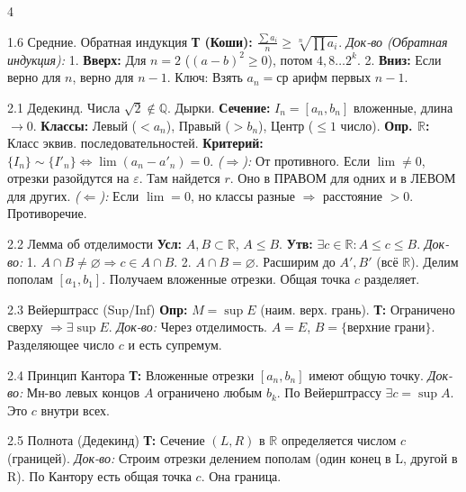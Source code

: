 \documentclass[8pt, a4paper, landscape]{extarticle}
\newcommand{\Ra}{\Rightarrow}
\newcommand{\Q}{\mathbb{Q}}
\newcommand{\R}{\mathbb{R}}
\newcommand{\eps}{\varepsilon}
\begin{document}
\begin{multicols*}{4}
\begin{ticket}{1.6 Средние. Обратная индукция}
\textbf{Т (Коши):} $\frac{\sum a_i}{n} \ge \sqrt[n]{\prod a_i}$.
\tcblower
\textit{Док-во (Обратная индукция):}
1. \textbf{Вверх:} Для $n=2$ ($(a-b)^2 \ge 0$), потом $4, 8 \dots 2^k$.
2. \textbf{Вниз:} Если верно для $n$, верно для $n-1$.
Ключ: Взять $a_n = \text{ср арифм первых } n-1$.
\end{ticket}


\begin{ticket}{2.1 Дедекинд. Числа}
$\sqrt{2} \notin \Q$. Дырки.
\textbf{Сечение:} $I_n = [a_n, b_n]$ вложенные, длина $\to 0$.
\textbf{Классы:} Левый ($<a_n$), Правый ($>b_n$), Центр ($\le 1$ число).
\textbf{Опр. $\R$:} Класс эквив. последовательностей.
\tcblower
\textbf{Критерий:} $\{I_n\} \sim \{I'_n\} \iff \lim(a_n - a'_n) = 0$.
\textit{($\Ra$):} От противного. Если $\lim \ne 0$, отрезки разойдутся на $\eps$.
Там найдется $r$. Оно в ПРАВОМ для одних и в ЛЕВОМ для других.
\textit{($\Leftarrow$):} Если $\lim=0$, но классы разные $\Ra$ расстояние $>0$. Противоречие.
\end{ticket}

\begin{ticket}{2.2 Лемма об отделимости}
\textbf{Усл:} $A, B \subset \R$, $A \le B$.
\textbf{Утв:} $\exists c \in \R: A \le c \le B$.
\tcblower
\textit{Док-во:}
1. $A \cap B \ne \varnothing \Ra c \in A \cap B$.
2. $A \cap B = \varnothing$. Расширим до $A', B'$ (всё $\R$).
Делим пополам $[a_1, b_1]$. Получаем вложенные отрезки.
Общая точка $c$ разделяет.
\end{ticket}

\begin{ticket}{2.3 Вейерштрасс (Sup/Inf)}
\textbf{Опр:} $M = \sup E$ (наим. верх. грань).
\textbf{Т:} Ограничено сверху $\Ra \exists \sup E$.
\tcblower
\textit{Док-во:} Через отделимость.
$A = E$, $B = \{ \text{верхние грани} \}$.
Разделяющее число $c$ и есть супремум.
\end{ticket}

\begin{ticket}{2.4 Принцип Кантора}
\textbf{Т:} Вложенные отрезки $[a_n, b_n]$ имеют общую точку.
\tcblower
\textit{Док-во:} Мн-во левых концов $A$ ограничено любым $b_k$.
По Вейерштрассу $\exists c = \sup A$. Это $c$ внутри всех.
\end{ticket}

\begin{ticket}{2.5 Полнота (Дедекинд)}
\textbf{Т:} Сечение $(L, R)$ в $\R$ определяется числом $c$ (границей).
\tcblower
\textit{Док-во:} Строим отрезки делением пополам (один конец в L, другой в R).
По Кантору есть общая точка $c$. Она граница.
\end{ticket}


\end{multicols*}
\end{document}

